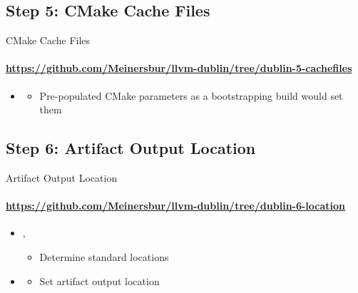 \subsection{Step 5: CMake Cache Files}
\begin{frame}[fragile]{CMake Cache Files}
\framesubtitle{\url{https://github.com/Meinersbur/llvm-dublin/tree/dublin-5-cachefiles}}
\begin{itemize}
\item[\pgfuseimage{file}] 
  \begin{itemize}
  \item Pre-populated CMake parameters as a bootstrapping build would set them
  \end{itemize}
\end{itemize}
\end{frame}



\subsection{Step 6: Artifact Output Location}
\begin{frame}[fragile]{Artifact Output Location}
\framesubtitle{\url{https://github.com/Meinersbur/llvm-dublin/tree/dublin-6-location}}
\begin{itemize}
\item[\pgfuseimage{file}] , 
  \begin{itemize}
  \item Determine standard locations 
  \end{itemize}
\item[\pgfuseimage{file}] 
  \begin{itemize}
  \item Set artifact output location
  \end{itemize}
\end{itemize}
\end{frame}


